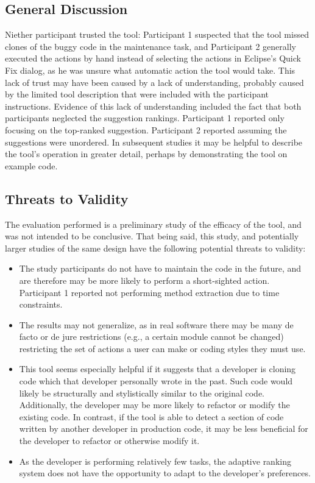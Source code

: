 \documentclass[nocopyrightspace,10pt]{sigplanconf}
\begin{document}
\subsection{General Discussion}
Niether participant trusted the tool: Participant 1 suspected that the
tool missed clones of the buggy code in the maintenance task, and
Participant 2 generally executed the actions by hand instead of
selecting the actions in Eclipse's Quick Fix dialog, as he was unsure
what automatic action the tool would take. This lack of trust may have
been caused by a lack of understanding, probably caused by the limited
tool description that were included with the participant
instructions. Evidence of this lack of understanding included the fact
that both participants neglected the suggestion rankings. Participant
1 reported only focusing on the top-ranked
suggestion. Participant 2 reported assuming the suggestions were
unordered. In subsequent studies it may be helpful to describe the
tool's operation in greater detail, perhaps by demonstrating the tool
on example code.

\subsection{Threats to Validity}
The evaluation performed is a preliminary study of the efficacy of the
tool, and was not intended to be conclusive. That being said, this
study, and potentially larger studies of the same design have the 
following potential threats to validity:

\begin{itemize}
  \item The study participants do not have to maintain the code in the
    future, and are therefore may be more likely to perform a
    short-sighted action. Participant 1 reported not performing method
    extraction due to time constraints.
  \item The results may not generalize, as in real software there may
    be many de facto or de jure restrictions (e.g., a certain module cannot
    be changed) restricting the set of actions a user can make or coding styles 
    they must use. 
  \item This tool seems especially helpful if it suggests that a
    developer is cloning code which that developer personally wrote in
    the past.  Such code would likely be structurally and
    stylistically similar to the original code. Additionally, the
    developer may be more likely to refactor or modify the existing
    code. 
    In contrast, if the tool is able to detect a section of
    code written by another developer in production code, it may be
    less beneficial for the developer to refactor or otherwise modify
    it.
  \item As the developer is performing relatively few tasks, the
    adaptive ranking system does not have the opportunity to adapt to
    the developer's preferences.
\end{itemize}
\end{document}
